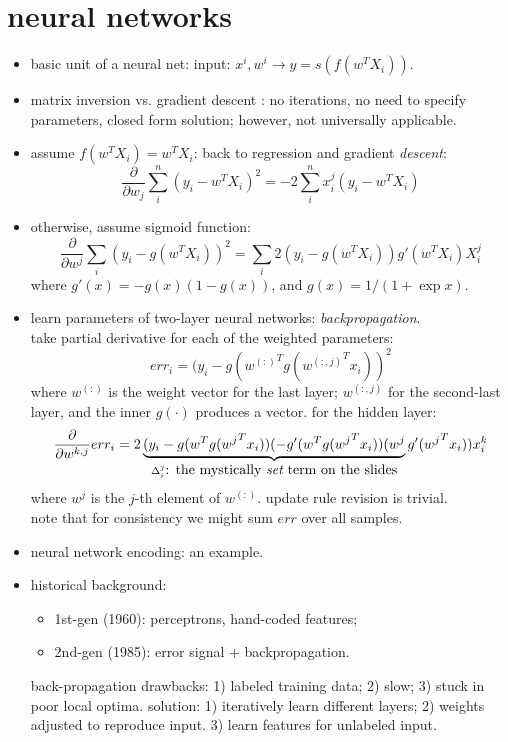 \documentclass{article}
\begin{document}
\section{neural networks}
\begin{itemize}
	\item basic unit of a neural net: input: $x^i,w^i\rightarrow y=s(f(w^TX_i))$.
	\item matrix inversion vs. gradient descent : no iterations, no need to specify
		parameters, closed form solution; however, not universally applicable.
	\item assume $f(w^TX_i)=w^TX_i$: back to regression and gradient \emph{descent}: 
		\begin{equation}
			\frac{\partial}{\partial w_j}\sum_i^n\left(y_i-w^TX_i\right)^2
			=-2\sum_i^{n}x_i^j\left(y_i-w^TX_i\right)
		\end{equation}
 	\item otherwise, assume sigmoid function: 
		\begin{equation}
			\frac{\partial}{\partial w^j}\sum_i\left(y_i-g(w^TX_i)\right)^2
			=\sum_i2\left(y_i-g(w^TX_i)\right)g'(w^TX_i)X_i^j
		\end{equation}
		where $g'(x)=-g(x)(1-g(x))$, and $g(x)=1/(1+\exp x)$.
	\item learn parameters of two-layer neural networks: \emph{backpropagation}. \\
		take partial derivative for each of the weighted parameters: 
		\begin{equation}
			err_i=(y_i-g({w^{(:)}}^Tg({w^{(:,j)}}^Tx_i))^2
		\end{equation}
		where $w^{(:)}$ is the weight vector for the last layer; $w^{(:,j)}$
		for the second-last layer, and the inner $g(\cdot)$ produces a vector. for the hidden layer:
		\begin{equation}
			\frac{\partial}{\partial w^{k,j}}err_i=2
			\underbrace{(y_i-g(w^Tg({w^{j}}^Tx_i))(-g'(w^Tg({w^{j}}^Tx_i))(w^j}_
			{\Delta_i^j\mbox{: the mystically {\it set} term on the slides}}g'({w^j}^Tx_i))x_i^k
		\end{equation}
		where $w^j$ is the $j$-th element of $w^{(:)}$. update rule revision is trivial. \\
		note that for consistency we might sum $err$ over all samples. 
	\item neural network encoding: an example. 
	\item historical background: 
		\begin{itemize}
			\item 1st-gen (1960): perceptrons, hand-coded features;
			\item 2nd-gen (1985): error signal + backpropagation. 
		\end{itemize}
		back-propagation drawbacks: 1) labeled training data; 2) slow;
		3) stuck in poor local optima. solution: 1) iteratively learn different layers; 
		2) weights adjusted to reproduce input. 3) learn features for unlabeled input. 
\end{itemize}
\end{document}
